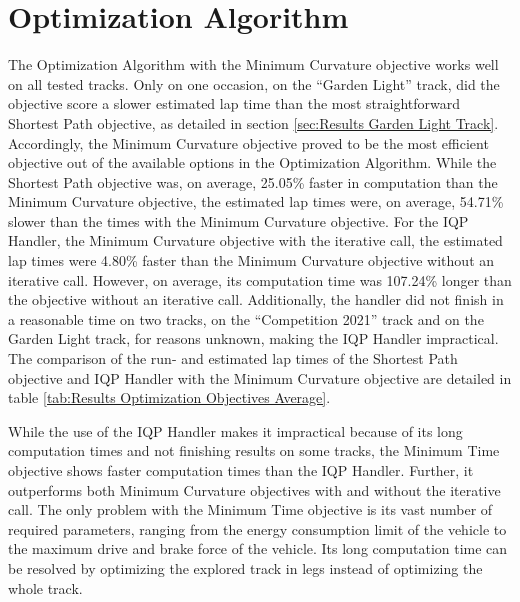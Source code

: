 \section{Optimization Algorithm}
The Optimization Algorithm with the Minimum Curvature objective works well on all tested tracks. Only on one occasion, on the ``Garden Light'' track, did the objective score a slower estimated lap time than the most straightforward Shortest Path objective, as detailed in section \ref{sec:Results Garden Light Track}. Accordingly, the Minimum Curvature objective proved to be the most efficient objective out of the available options in the Optimization Algorithm. While the Shortest Path objective was, on average, 25.05\% faster in computation than the Minimum Curvature objective, the estimated lap times were, on average, 54.71\% slower than the times with the Minimum Curvature objective. For the IQP Handler, the Minimum Curvature objective with the iterative call, the estimated lap times were 4.80\% faster than the Minimum Curvature objective without an iterative call. However, on average, its computation time was 107.24\% longer than the objective without an iterative call. Additionally, the handler did not finish in a reasonable time on two tracks, on the ``Competition 2021'' track and on the Garden Light track, for reasons unknown, making the IQP Handler impractical. The comparison of the run- and estimated lap times of the Shortest Path objective and IQP Handler with the Minimum Curvature objective are detailed in table \ref{tab:Results Optimization Objectives Average}.

While the use of the IQP Handler makes it impractical because of its long computation times and not finishing results on some tracks, the Minimum Time objective shows faster computation times than the IQP Handler. Further, it outperforms both Minimum Curvature objectives with and without the iterative call. The only problem with the Minimum Time objective is its vast number of required parameters, ranging from the energy consumption limit of the vehicle to the maximum drive and brake force of the vehicle. Its long computation time can be resolved by optimizing the explored track in legs instead of optimizing the whole track.

